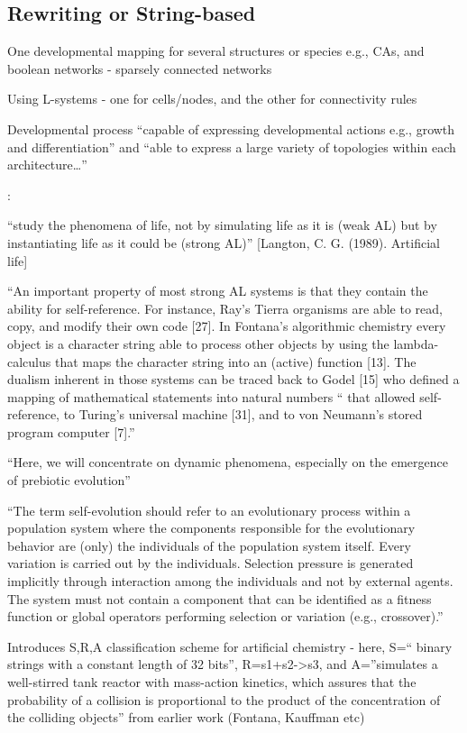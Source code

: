 \subsection{Rewriting or String-based}

\autocite{Antonakopoulos:2011th}

One developmental mapping for several structures or species e.g., CAs, and boolean networks - sparsely connected networks

Using L-systems - one for cells/nodes, and the other for connectivity rules

Developmental process ``capable of expressing developmental actions e.g., growth and differentiation'' and ``able to express a large variety of topologies within each architecture\ldots{}''

\autocite{Dittrich1998}:

``study the phenomena of life, not by simulating life as it is (weak AL) but by instantiating life as it could be (strong AL)'' {[}Langton, C. G. (1989). Artificial life{]}

``An important property of most strong AL systems is that they contain the ability for self-reference. For instance, Ray's Tierra organisms are able to read, copy, and modify their own code {[}27{]}. In Fontana's algorithmic chemistry every object is a character string able to process other objects by using the lambda-calculus that maps the character string into an (active) function {[}13{]}. The dualism inherent in those systems can be traced back to Godel {[}15{]} who defined a mapping of mathematical statements into natural numbers `` that allowed self-reference, to Turing's universal machine {[}31{]}, and to von Neumann's stored program computer {[}7{]}.''

``Here, we will concentrate on dynamic phenomena, especially on the emergence of prebiotic evolution''

``The term self-evolution should refer to an evolutionary process within a population system where the components responsible for the evolutionary behavior are (only) the individuals of the population
system itself. Every variation is carried out by the individuals.
Selection pressure is generated implicitly through interaction among
the individuals and not by external agents. The system must not
contain a component that can be identified as a fitness function or
global operators performing selection or variation (e.g.,
crossover).''

Introduces S,R,A classification scheme for artificial chemistry -
here, S=`` binary strings with a constant length of 32 bits'',
R=s1+s2-\textgreater{}s3, and A=''simulates a well-stirred tank
reactor with mass-action kinetics, which assures that the probability
of a collision is proportional to the product of the concentration of
the colliding objects'' from earlier work (Fontana, Kauffman etc)

